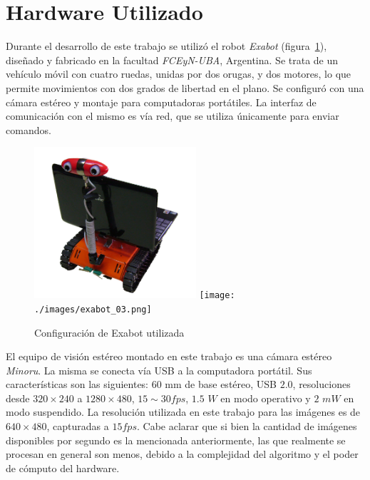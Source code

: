 \documentclass[journal]{IEEEtran}
\begin{document}
\section{Hardware Utilizado}
\label{sec:hardware}


Durante el desarrollo de este trabajo se utiliz\'o el robot \emph{Exabot} (figura~\ref{fig:exabot}), dise\~nado y fabricado en la facultad \emph{FCEyN-UBA}, Argentina. Se trata de un veh\'iculo m\'ovil con cuatro ruedas, unidas por dos orugas, y dos motores, lo que permite movimientos con dos grados de libertad en el plano. Se configur\'o con una c\'amara est\'ereo y montaje para computadoras port\'atiles. La interfaz de comunicaci\'on con el mismo es v\'ia red, que se utiliza \'unicamente para enviar comandos.

\begin{figure}[ht]
	\begin{center}
		\includegraphics[width=6cm]{./images/exabot_04.png}
		\texttt{[image: ./images/exabot\_03.png]}
	\end{center}
	\caption{Configuraci\'on de Exabot utilizada}
	\label{fig:exabot}
\end{figure}

El equipo de visi\'on est\'ereo montado en este trabajo es una c\'amara est\'ereo \emph{Minoru}. La misma se conecta v\'ia USB a la computadora port\'atil. Sus caracter\'isticas son las siguientes: 60 mm de base est\'ereo, USB $2.0$, resoluciones desde $320 \times 240$ a $1280 \times 480$, $15 \sim 30fps$, $1.5$ $W$ en modo operativo y $2$ $mW$ en modo suspendido. La resoluci\'on utilizada en este trabajo para las im\'agenes es de $640 \times 480$, capturadas a $15fps$. Cabe aclarar que si bien la cantidad de im\'agenes disponibles por segundo es la mencionada anteriormente, las que realmente se procesan en general son menos, debido a la complejidad del algoritmo y el poder de c\'omputo del hardware.
\end{document}
